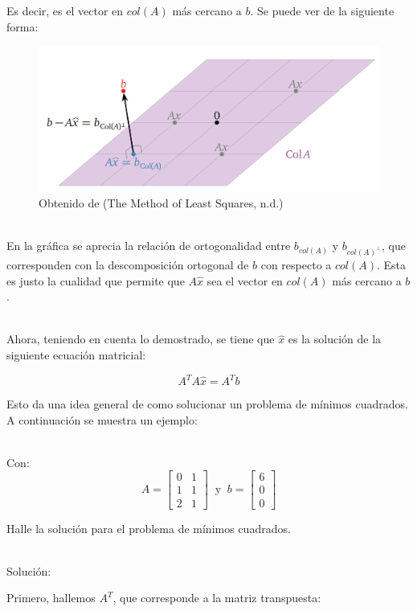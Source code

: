 {{{{Es decir, es el vector en $col(A)$ más cercano a $b$. Se puede ver de la siguiente forma:

\begin{figure}
    \centering
    \includegraphics[width=1\linewidth]{image_2025-01-17_190701322.png}
    \caption{Obtenido de (The Method of Least Squares, n.d.)}
\end{figure}

\\

En la gráfica se aprecia la relación de ortogonalidad entre $b_{col(A)}$ y $b_{col(A)^\perp}$, que corresponden con la descomposición ortogonal de $b$ con respecto a $col(A)$. Esta es justo la cualidad que permite que $A\hat{x}$ sea el vector en $col(A)$ más cercano a $b$.
 
\\ Ahora, teniendo en cuenta lo demostrado, se tiene que $\hat{x}$ es la solución de la siguiente ecuación matricial:

$$ A^TA\hat{x} = A^Tb$$

Esto da una idea general de como solucionar un problema de mínimos cuadrados. A continuación se muestra un ejemplo:

\\ Con: $$A = \begin{bmatrix}
0 & 1 \\
1 & 1 \\
2 & 1
\end{bmatrix} \;\;\text{y} \;\; b = \begin{bmatrix} 6 \\ 0\\ 0 \end{bmatrix}$$

Halle la solución para el problema de mínimos cuadrados.

\\Solución: 

Primero, hallemos $A^T$, que corresponde a la matriz transpuesta:

}}}}
